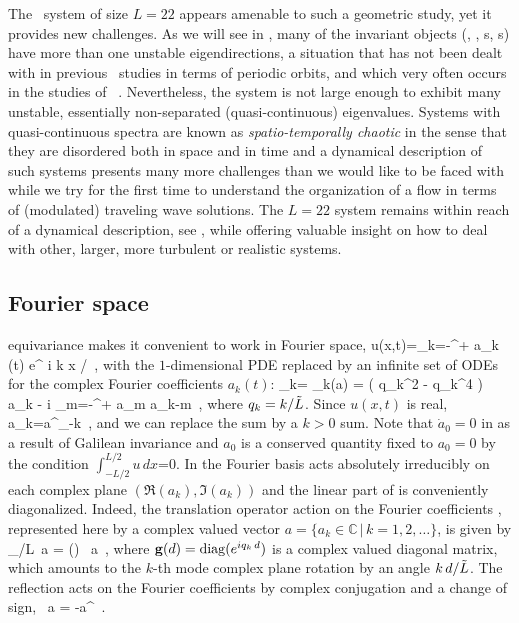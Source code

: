 The \KS\ system of size $L=22$ appears amenable to such a
geometric study, yet it provides new challenges. As we will
see in , many of the invariant objects
(\eqva, \reqva, {\po s}, {\rpo s}) have more than one
unstable eigendirections, a situation that has not been dealt
with in previous \KSe\ studies in terms of periodic
orbits, and which very
often occurs in the studies of \pCf\
. Nevertheless, the
system is not large enough to exhibit many unstable,
essentially non-separated (quasi-continuous) eigenvalues.
Systems with quasi-continuous spectra are known as
\emph{spatio-temporally chaotic} in the sense that they are
disordered both in space and in
time and a dynamical
description of such systems presents many more challenges
than we would like to be faced with while we try for the
first time to understand the organization of a flow in terms
of (modulated) traveling wave solutions.  The $L=22$ system
remains within reach of a dynamical description, see
, while offering
valuable insight on how to deal with other, larger, more
turbulent or realistic systems.




\subsection{Fourier space}
\label{sec:fourKS}

 equivariance makes it convenient to work in Fourier space,
\beq
  u(x,t)=\sum_{k=-\infty}^{+\infty} a_k (t) e^{ i k x /\tildeL }
\,,
with the $1$-dimensional PDE 
replaced by an infinite set of
ODEs for the complex Fourier coefficients $a_k(t)$:
\beq
{}_k= \pVeloc_k(a)
     = ( q_k^2 - q_k^4 )\, a_k
    - i  \sum_{m=-\infty}^{+\infty} a_m a_{k-m}
\,,
where $q_k = k/\tildeL$.
Since $u(x,t)$ is real,
 \beq
  a_{k}=a^\ast_{-k} \,,
  \label{eq:astar}
 \eeq
and we can replace the
sum by a $k > 0$ sum. Note that $\dot{a}_0=0$ in
  as a result of Galilean invariance and $a_0$ is a conserved quantity
 fixed to $a_0=0$ by the condition $\int_{-L/2}^{L/2} u\,dx$=0.
In the Fourier basis  acts absolutely irreducibly on each complex plane
$\left(\Re(a_k),\Im(a_k)\right)$ and the linear part of \refeq{expan} is conveniently
diagonalized. Indeed, the translation operator action on the Fourier coefficients ,
represented here by a complex valued vector
$a = \{a_k\in\mathbb{C}\,|\,k = 1, 2, \ldots\}$, is given by
\beq
  \Shift_{\shift/L}\, a = (\shift) \, a \,,
  \label{eq:shiftF}
\eeq
where $\mathbf{g}(d) = \mathrm{diag}( e^{i q_k\, d} )$ is a complex
valued diagonal matrix, which amounts to the $k$-th mode complex plane
rotation by an angle $k\, d /\tilde{L}$. The reflection acts on
the Fourier coefficients by complex conjugation and a change of sign,
\beq
  \Refl \, a = -a^\ast
\,.
\label{eq:FModInvSymm}
\eeq

